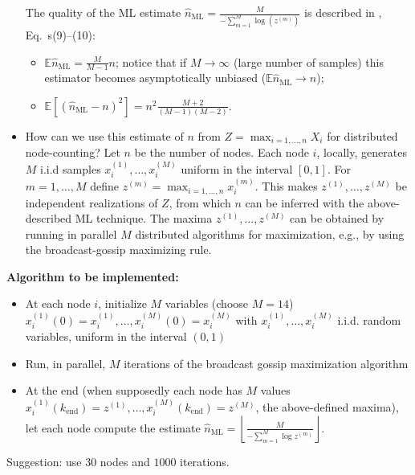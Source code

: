 \documentclass{article}
\begin{document}
\begin{itemize}
The quality of the ML estimate $\hat n_{\mathrm{ML}} = \frac{M}{-\sum_{m=1}^M \log(z^{(m)})}$ is described in
\cite{node-counting}, Eq.~s(9)--(10):
	\begin{itemize}
	\item $\mathbb E \hat n_{\mathrm{ML}} = \frac{M}{M-1} n $; notice that if $M\to \infty$ (large number of 		samples) this estimator becomes asymptotically unbiased ($\mathbb E \hat n_{\mathrm{ML}} \to n$);
	\item $\mathbb E [ (\hat n_{\mathrm{ML}} -n)^2] = n^2 \frac{M+2}{(M-1)(M-2) } $.
	\end{itemize}
\item How can we use this estimate of $n$ from $Z = \max_{i=1,\dots,n} X_i$  for distributed node-counting?
Let $n$ be the number of nodes. Each node $i$, locally, generates $M$ i.i.d samples $x_i^{(1)}, \dots, x_i^{(M)}$ uniform in the interval $[0,1]$. For $m=1,\dots,M$ define $z^{(m)} = \max_{i=1,\dots,n} x_i^{(m)}$. This makes $z^{(1)}, \dots, z^{(M)}$ be independent realizations of $Z$, from which $n$ can be inferred with the above-described ML technique. The maxima $z^{(1)}, \dots, z^{(M)}$ can be obtained by running in parallel $M$ distributed algorithms for maximization, e.g., by using the broadcast-gossip maximizing rule.
\end{itemize}

\textbf{Algorithm to be implemented:}
\begin{itemize}
\item At each node $i$, initialize $M$ variables (choose $M=14$) $x_i^{(1)}(0) =x_i^{(1)}, \dots, x_i^{(M)}(0) = x_i^{(M)}$ with
$x_i^{(1)}, \dots, x_i^{(M)}$ i.i.d. random variables, uniform in the interval $(0,1)$
\item Run, in parallel, $M$ iterations of the broadcast gossip maximization algorithm
\item At the end (when supposedly each node has $M$ values
$ x_i^{(1)}(k_{\text{end}})= z^{(1)}, \dots,x_i^{(M)}(k_{\text{end}})= z^{(M)}$, the above-defined maxima), let each node compute the estimate $\hat{n}_{\text{ML}} = \left \lfloor \frac{M}{- \sum_{m=1}^M \log z^{(m)}}\right \rfloor$.
\end{itemize}
Suggestion: use $30$ nodes and $1000$ iterations.\\
\end{document}
